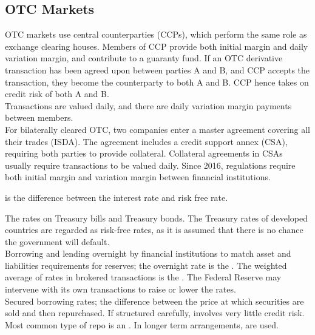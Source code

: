 \documentclass[a4paper,oneside,openany]{book}
\begin{document}
\subsection{OTC Markets}

OTC markets use central counterparties (CCPs), which perform the same role as exchange clearing houses. Members of CCP provide both initial margin and daily variation margin, and contribute to a guaranty fund. If an OTC derivative transaction has been agreed upon between parties A and B, and CCP accepts the transaction, they become the counterparty to both A and B. CCP hence takes on credit risk of both A and B.\\
Transactions are valued daily, and there are daily variation margin payments between members.\\

For bilaterally cleared OTC, two companies enter a master agreement covering all their trades (ISDA). The agreement includes a credit support annex (CSA), requiring both parties to provide collateral. Collateral agreements in CSAs usually require transactions to be valued daily. Since 2016, regulations require both initial margin and variation margin between financial institutions.

\begin{definition}  is the difference between the interest rate and risk free rate.
\end{definition}

 The rates on Treasury bills and Treasury bonds. The Treasury rates of developed countries are regarded as risk-free rates, as it is assumed that there is no chance the government will default.\\

 Borrowing and lending overnight by financial institutions to match asset and liabilities requirements for reserves; the overnight rate is the . The weighted average of rates in brokered transactions is the . The Federal Reserve may intervene with its own transactions to raise or lower the rates.\\

 Secured borrowing rates; the difference between the price at which securities are sold and then repurchased. If structured carefully, involves very little credit risk. Most common type of repo is an . In longer term arrangements,  are used.\\
\end{document}
